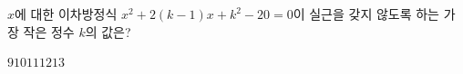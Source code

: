 $x$에 대한 이차방정식 $x^2+2(k-1)x+k^2-20=0$이 실근을 갖지 않도록 하는 가장 작은 정수 $k$의 값은?
\begin{choices32}{$9$}{$10$}{$11$}{$12$}{$13$}\end{choices32}
